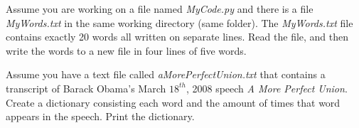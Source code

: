 	\item
		Assume you are working on a file named \textit{MyCode.py} and there is a file \textit{MyWords.txt} in the same 
		working directory (same folder). The \textit{MyWords.txt} file contains exactly 20 words all written on separate
		lines. Read the file, and then write the words to a new file in four lines of five words.



	\item
		Assume you have a text file called \textit{aMorePerfectUnion.txt} that contains a transcript 
		of Barack Obama's March $18^{th}$, 2008 speech \textit{A More Perfect Union}. Create a 
		dictionary consisting each word and the amount of times that word appears in the speech. 
		Print the dictionary.


